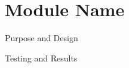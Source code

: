 \section{Module Name}

\begin{frame}{Purpose and Design}
\end{frame}

\begin{frame}{Testing and Results}
\end{frame}

